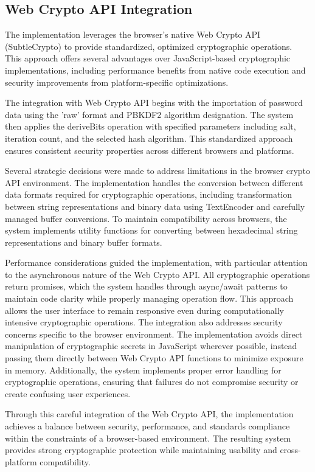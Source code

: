 \documentclass[11pt,a4paper]{article}
\begin{document}
\subsection{Web Crypto API Integration}
The implementation leverages the browser's native Web Crypto API (SubtleCrypto) to provide standardized, optimized cryptographic operations. This approach offers several advantages over JavaScript-based cryptographic implementations, including performance benefits from native code execution and security improvements from platform-specific optimizations.

The integration with Web Crypto API begins with the importation of password data using the 'raw' format and PBKDF2 algorithm designation. The system then applies the deriveBits operation with specified parameters including salt, iteration count, and the selected hash algorithm. This standardized approach ensures consistent security properties across different browsers and platforms.

Several strategic decisions were made to address limitations in the browser crypto API environment. The implementation handles the conversion between different data formats required for cryptographic operations, including transformation between string representations and binary data using TextEncoder and carefully managed buffer conversions. To maintain compatibility across browsers, the system implements utility functions for converting between hexadecimal string representations and binary buffer formats.

Performance considerations guided the implementation, with particular attention to the asynchronous nature of the Web Crypto API. All cryptographic operations return promises, which the system handles through async/await patterns to maintain code clarity while properly managing operation flow. This approach allows the user interface to remain responsive even during computationally intensive cryptographic operations.
The integration also addresses security concerns specific to the browser environment. The implementation avoids direct manipulation of cryptographic secrets in JavaScript wherever possible, instead passing them directly between Web Crypto API functions to minimize exposure in memory. Additionally, the system implements proper error handling for cryptographic operations, ensuring that failures do not compromise security or create confusing user experiences.

Through this careful integration of the Web Crypto API, the implementation achieves a balance between security, performance, and standards compliance within the constraints of a browser-based environment. The resulting system provides strong cryptographic protection while maintaining usability and cross-platform compatibility.
\end{document}
